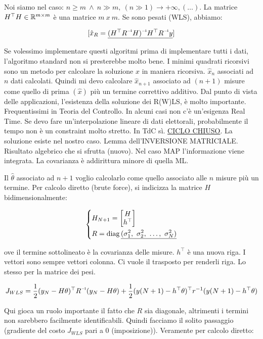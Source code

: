 Noi siamo nel caso: $n\geq m\ \land\ n\gg m,\ (n\gg 1)\to+\infty,(\dots)$. La matrice $H^\top H\in\mathbb{R}^{m\times m}$ è una matrice $m\ x\ m$. Se sono pesati (WLS), abbiamo:

\[
	[\hat{x}_R = \underline{\inv{(H^\top\inv{R}H)}H^\top\inv{R}y}]
\]

Se volessimo implementare questi algoritmi prima di implementare tutti i dati, l'algoritmo standard non si presterebbe molto bene. I minimi quadrati ricorsivi sono un metodo per calcolare la soluzione $\hat{x}$ in maniera ricorsiva. $\hat{x}_n$ associati ad $n$ dati calcolati. Quindi mi devo calcolare $\hat{x}_{n+1}$ associato ad $(n+1)$ misure come quello di prima $(\hat{x})$ più un termine correttivo additivo. Dal punto di vista delle applicazioni, l'esistenza della soluzione dei R(W)LS, è molto importante. Frequentissimi in Teoria del Controllo. In alcuni casi non c'è un'esigenza Real Time. Se devo fare un'interpolazione lineare di dati elettorali, probabilmente il tempo non è un constraint molto stretto. In TdC sì. \underline{CICLO CHIUSO}. La soluzione esiste nel nostro caso. Lemma dell'INVERSIONE MATRICIALE. Risultato algebrico che si sfrutta (nuovo). Nel caso MAP l'informazione viene integrata. La covarianza è addirittura minore di quella ML.

Il $\hat{\theta}$ associato ad $n+1$ voglio calcolarlo come quello associato alle $n$ misure più un termine. Per calcolo diretto (brute force), si indicizza la matrice $H$ bidimensionalmente:

\[
	\left\{
	\begin{aligned}
	&H_{N+1}=\begin{bmatrix}H\\h^\top\end{bmatrix}\\
	&R = \diag{\underline{(\sigma_1^2,\ \sigma_2^2,\ \dots,\ \sigma_N^2)}}
	\end{aligned}
	\right.
\]

ove il termine sottolineato è la covarianza delle misure. $h^\top$ è una nuova riga. I vettori sono sempre vettori colonna. Ci vuole il trasposto per renderli riga. Lo stesso per la matrice dei pesi. 

\[
	J_{WLS} = \frac{1}{2}(y_N-H\theta)^\top\inv{R}(y_N-H\theta) + \frac{1}{2}(y(N+1)-h^\top\theta)^\top r^{-1}(y(N+1)-h^\top\theta)
\]

Qui gioca un ruolo importante il fatto che $R$ sia diagonale, altrimenti i termini non sarebbero facilmente identificabili. Quindi facciamo il solito passaggio (gradiente del costo $J_{WLS}$ pari a 0 (imposizione)). Veramente per calcolo diretto:

